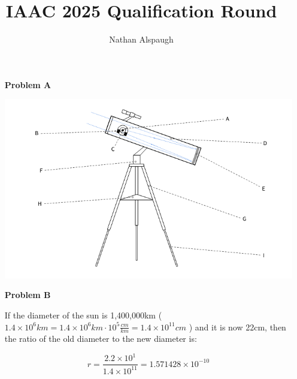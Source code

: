 \documentclass{article}
\title{IAAC 2025 Qualification Round}
\author{Nathan Alspaugh}
\theoremstyle{plain}
\begin{document}
\maketitle
\begin{enumerate}
    \item[\textbf{Problem A}] \begin{center}
              \includegraphics[width=1\textwidth]{images/telescope.png}
          \end{center}
          \begin{center}
          \end{center}
    \item[\textbf{Problem B}]{
          If the diameter of the sun is 1,400,000km ($1.4\times10^{6}km = 1.4\times10^{6}km\cdot10^{5}\frac{cm}{km} = 1.4\times10^{11}cm$ ) and it is now 22cm, then the ratio of the old diameter to the new diameter is:
          \begin{center}
              \[
                  r = \frac{2.2 \times 10^{1}}{1.4 \times 10^{11}} = 1.571428 \times 10^{-10}
              \]


\end{center}}
\end{enumerate}
\end{document}
